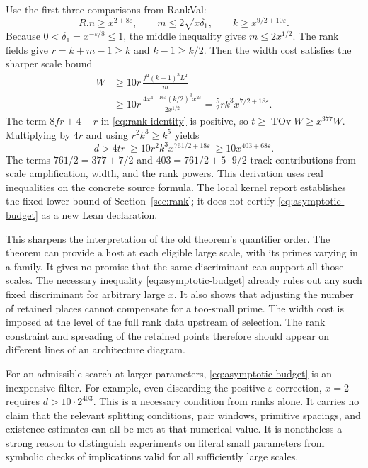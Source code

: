 \documentclass[12pt,letterpaper]{article}
\DeclareRobustCommand{\id}[1]{\mbox{\small\ttfamily #1}}
\begin{document}
Use the first three comparisons from \id{RankVal}:
\[
 R.n\ge x^{2+8\varepsilon},\qquad
 m\le 2\sqrt{x\delta_1},\qquad
 k\ge x^{9/2+10\varepsilon}.
\]
Because $0<\delta_1=x^{-\varepsilon/8}\le1$, the middle inequality gives $m\le2x^{1/2}$. The rank fields give $r=k+m-1\ge k$ and $k-1\ge k/2$. Then the width cost satisfies the sharper scale bound
\begin{align*}
 W&\ge 10r\,\frac{f^2(k-1)^3 L^2}{m}\\
  &\ge 10r\,\frac{4x^{4+16\varepsilon}(k/2)^3 x^{2\varepsilon}}
                       {2x^{1/2}}
  =\frac52 r k^3 x^{7/2+18\varepsilon}.
\end{align*}
The term $8fr+4-r$ in \eqref{eq:rank-identity} is positive, so $t\ge \operatorname{TOv} W\ge x^{377}W$. Multiplying by $4r$ and using $r^2k^3\ge k^5$ yields
\begin{equation}
              d > 4tr
              \ \ge 10r^2 k^3 x^{761/2+18\varepsilon}
              \ \ge 10 x^{403+68\varepsilon}.
              \label{eq:asymptotic-budget}
\end{equation}
The terms \(761/2=377+7/2\) and \(403=761/2+5\cdot9/2\) track contributions from scale amplification, width, and the rank powers. This derivation uses real inequalities on the concrete source formula. The local kernel report establishes the fixed lower bound of Section~\ref{sec:rank}; it does not certify \eqref{eq:asymptotic-budget} as a new Lean declaration.

This sharpens the interpretation of the old theorem's quantifier order. The theorem can provide a host at each eligible large scale, with its primes varying in a family. It gives no promise that the same discriminant can support all those scales. The necessary inequality \eqref{eq:asymptotic-budget} already rules out any such fixed discriminant for arbitrary large $x$. It also shows that adjusting the number of retained places cannot compensate for a too-small prime. The width cost is imposed at the level of the full rank data upstream of selection. The rank constraint and spreading of the retained points therefore should appear on different lines of an architecture diagram.

For an admissible search at larger parameters, \eqref{eq:asymptotic-budget} is an inexpensive filter. For example, even discarding the positive $\varepsilon$ correction, $x=2$ requires $d>10\cdot 2^{403}$. This is a necessary condition from ranks alone. It carries no claim that the relevant splitting conditions, pair windows, primitive spacings, and existence estimates can all be met at that numerical value. It is nonetheless a strong reason to distinguish experiments on literal small parameters from symbolic checks of implications valid for all sufficiently large scales.
\end{document}
